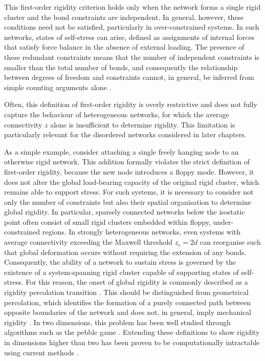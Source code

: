 \documentclass[asymmetricmargins]{library/duthesis}%
\begin{document}
This first-order rigidity criterion holds only when the network forms a single rigid cluster and the bond constraints are independent. In general, however, these conditions need not be satisfied, particularly in over-constrained systems. In such networks, states of self-stress can arise, defined as assignments of internal forces that satisfy force balance in the absence of external loading. The presence of these redundant constraints means that the number of independent constraints is smaller than the total number of bonds, and consequently the relationship between degrees of freedom and constraints cannot, in general, be inferred from simple counting arguments alone \cite{calladine_buckminster_1978}.

Often, this definition of first-order rigidity is overly restrictive and does not fully capture the behaviour of heterogeneous networks, for which the average connectivity $z$ alone is insufficient to determine rigidity. This limitation is particularly relevant for the disordered networks considered in later chapters.

As a simple example, consider attaching a single freely hanging node to an otherwise rigid network. This addition formally violates the strict definition of first-order rigidity, because the new node introduces a floppy mode. However, it does not alter the global load-bearing capacity of the original rigid cluster, which remains able to support stress. For such systems, it is necessary to consider not only the number of constraints but also their spatial organisation to determine global rigidity. In particular, sparsely connected networks below the isostatic point often consist of small rigid clusters embedded within floppy, under-constrained regions. In strongly heterogeneous networks, even systems with average connectivity exceeding the Maxwell threshold $z_c = 2d$ can reorganise such that global deformation occurs without requiring the extension of any bonds. Consequently, the ability of a network to sustain stress is governed by the existence of a system-spanning rigid cluster capable of supporting states of self-stress. For this reason, the onset of global rigidity is commonly described as a rigidity percolation transition \cite{zhang_correlated_2019}. This should be distinguished from geometrical percolation, which identifies the formation of a purely connected path between opposite boundaries of the network and does not, in general, imply mechanical rigidity \cite{kendall_percolation_2009,broadbent_percolation_1957}. In two dimensions, this problem has been well studied \cite{ellenbroek_rigidity_2015} through algorithms such as the pebble game \cite{jacobs_algorithm_1997, jacobs_generic_1995}. Extending these definitions to show rigidity in dimensions higher than two has been proven to be computationally intractable using current methods \cite{abbott_generalizations_2008}.
\end{document}
